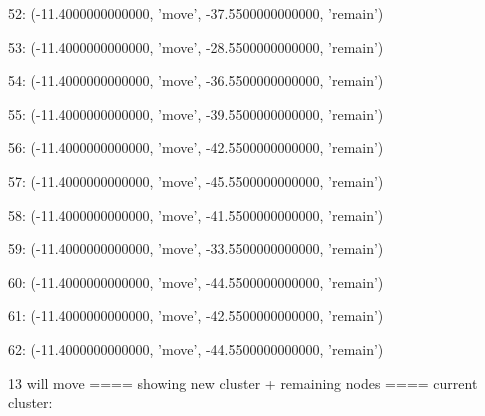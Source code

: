 52: (-11.4000000000000, 'move', -37.5500000000000, 'remain')


53: (-11.4000000000000, 'move', -28.5500000000000, 'remain')


54: (-11.4000000000000, 'move', -36.5500000000000, 'remain')


55: (-11.4000000000000, 'move', -39.5500000000000, 'remain')


56: (-11.4000000000000, 'move', -42.5500000000000, 'remain')


57: (-11.4000000000000, 'move', -45.5500000000000, 'remain')


58: (-11.4000000000000, 'move', -41.5500000000000, 'remain')


59: (-11.4000000000000, 'move', -33.5500000000000, 'remain')


60: (-11.4000000000000, 'move', -44.5500000000000, 'remain')


61: (-11.4000000000000, 'move', -42.5500000000000, 'remain')


62: (-11.4000000000000, 'move', -44.5500000000000, 'remain')


13 will move
==== showing new cluster + remaining nodes ====
current cluster:


